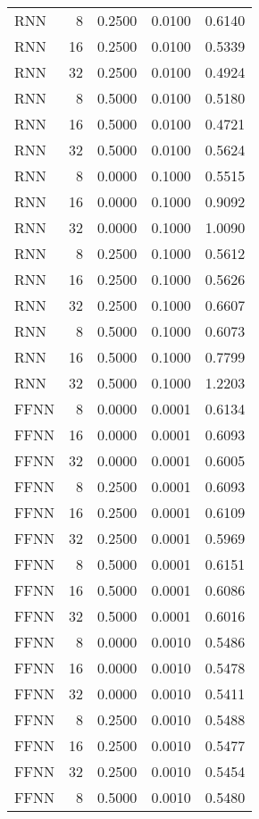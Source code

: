 \begin{table}[h!]
\begin{adjustbox}{max width=\textwidth}
\begin{tabular}{lrrrr}
  RNN &     8 & 0.2500 & 0.0100 & 0.6140 \\ 
  RNN &    16 & 0.2500 & 0.0100 & 0.5339 \\ 
  RNN &    32 & 0.2500 & 0.0100 & 0.4924 \\ 
  RNN &     8 & 0.5000 & 0.0100 & 0.5180 \\ 
  RNN &    16 & 0.5000 & 0.0100 & 0.4721 \\ 
  RNN &    32 & 0.5000 & 0.0100 & 0.5624 \\ 
  RNN &     8 & 0.0000 & 0.1000 & 0.5515 \\ 
  RNN &    16 & 0.0000 & 0.1000 & 0.9092 \\ 
  RNN &    32 & 0.0000 & 0.1000 & 1.0090 \\ 
  RNN &     8 & 0.2500 & 0.1000 & 0.5612 \\ 
  RNN &    16 & 0.2500 & 0.1000 & 0.5626 \\ 
  RNN &    32 & 0.2500 & 0.1000 & 0.6607 \\ 
  RNN &     8 & 0.5000 & 0.1000 & 0.6073 \\ 
  RNN &    16 & 0.5000 & 0.1000 & 0.7799 \\ 
  RNN &    32 & 0.5000 & 0.1000 & 1.2203 \\ 
  FFNN &     8 & 0.0000 & 0.0001 & 0.6134 \\ 
  FFNN &    16 & 0.0000 & 0.0001 & 0.6093 \\ 
  FFNN &    32 & 0.0000 & 0.0001 & 0.6005 \\ 
  FFNN &     8 & 0.2500 & 0.0001 & 0.6093 \\ 
  FFNN &    16 & 0.2500 & 0.0001 & 0.6109 \\ 
  FFNN &    32 & 0.2500 & 0.0001 & 0.5969 \\ 
  FFNN &     8 & 0.5000 & 0.0001 & 0.6151 \\ 
  FFNN &    16 & 0.5000 & 0.0001 & 0.6086 \\ 
  FFNN &    32 & 0.5000 & 0.0001 & 0.6016 \\ 
  FFNN &     8 & 0.0000 & 0.0010 & 0.5486 \\ 
  FFNN &    16 & 0.0000 & 0.0010 & 0.5478 \\ 
  FFNN &    32 & 0.0000 & 0.0010 & 0.5411 \\ 
  FFNN &     8 & 0.2500 & 0.0010 & 0.5488 \\ 
  FFNN &    16 & 0.2500 & 0.0010 & 0.5477 \\ 
  FFNN &    32 & 0.2500 & 0.0010 & 0.5454 \\ 
  FFNN &     8 & 0.5000 & 0.0010 & 0.5480 \\ 

\end{tabular}
\end{adjustbox}
\end{table}
